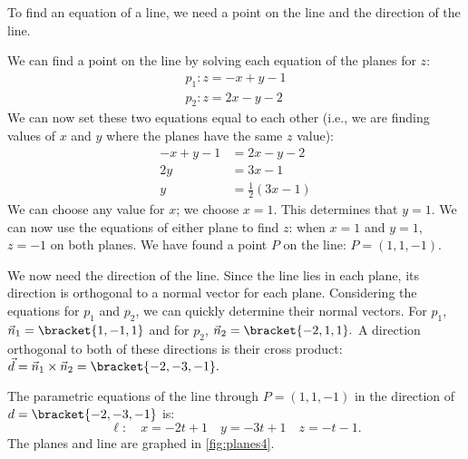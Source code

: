 {To find an equation of a line, we need a point on the line and the direction of the line. 

We can find a point on the line by solving each equation of the planes for $z$:
\begin{gather*}
p_1: z = -x+y-1 \\
p_2: z = 2x-y-2
\end{gather*}
We can now set these two equations equal to each other (i.e., we are finding values of $x$ and $y$ where the planes have the same $z$ value):
\begin{align*}
-x+y-1 &= 2x-y-2 \\
2y &= 3x-1\\
y &= \frac12(3x-1)
\end{align*}
We can choose any value for $x$; we choose $x=1$. This determines that $y=1$. We can now use the equations of either plane to find $z$: when $x=1$ and $y=1$, $z=-1$ on both planes. We have found a point $P$  on the line: $P= (1,1,-1)$. 


We now need the direction of the line. Since the line lies in each plane, its direction is orthogonal to a normal vector for each plane. Considering the equations for $p_1$ and $p_2$, we can quickly determine their normal vectors. For $p_1$, $\vec n_1 =\bracket{1,-1,1}$ and for $p_2$, $\vec n_2 =\bracket{-2,1,1}.$ A direction orthogonal to both of these directions is their cross product: $\vec d = \vec n_1\times \vec n_2 =\bracket{-2,-3,-1}.$

The parametric equations of the line through $P=(1,1,-1)$ in the direction of $d=\bracket{-2,-3,-1}$ is:
\[\ell: \quad x= -2t+1\quad y = -3t+1\quad z=-t-1.\]
The planes and line are graphed in \autoref{fig:planes4}.}

